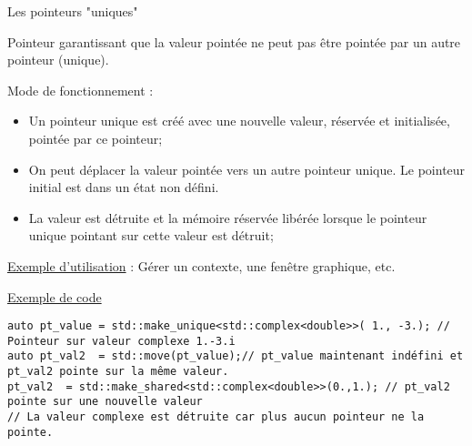 \documentclass[compress,10pt,aspectratio=169]{beamer}
\begin{document}
\begin{frame}[fragile]{Les pointeurs "uniques"}
\scriptsize
  
Pointeur garantissant que la valeur pointée ne peut pas être pointée par un autre pointeur (unique).
  
Mode de fonctionnement :
\begin{itemize}
  \item Un pointeur unique est créé avec une nouvelle valeur, réservée et initialisée, pointée par ce pointeur;
  \item On peut déplacer la valeur pointée vers un autre pointeur unique. Le pointeur initial est dans un état non défini.
  \item La valeur est détruite et la mémoire réservée libérée lorsque le pointeur unique pointant sur cette valeur est détruit;
  \end{itemize}
  
\underline{Exemple d'utilisation} : Gérer un contexte, une fenêtre graphique, etc.

\vspace*{2mm}
\underline{Exemple de code}
\begin{verbatim}
auto pt_value = std::make_unique<std::complex<double>>( 1., -3.); // Pointeur sur valeur complexe 1.-3.i
auto pt_val2  = std::move(pt_value);// pt_value maintenant indéfini et pt_val2 pointe sur la même valeur.
pt_val2  = std::make_shared<std::complex<double>>(0.,1.); // pt_val2 pointe sur une nouvelle valeur
// La valeur complexe est détruite car plus aucun pointeur ne la pointe.
\end{verbatim}
\end{frame}
\end{document}
